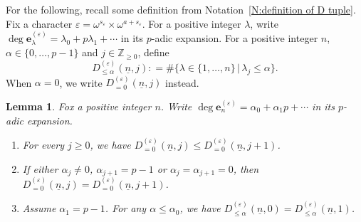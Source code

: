 \documentclass[12pt]{amsart}
\newcommand{\liang}[1]{{\color{blue} \sf $\clubsuit\clubsuit\clubsuit$ Liang: [#1]}}
\newtheorem{lemma}[subsection]{Lemma}
\theoremstyle{definition}
\numberwithin{equation}{subsection}
\def\ZZ{\mathbb{Z}}
\def\bfe{\mathbf{e}}
\begin{document}
For the following, recall some definition from Notation~\ref{N:definition of D tuple}. Fix a character $\varepsilon = \omega^{s_\varepsilon} \times \omega^{a+s_\varepsilon}$.
For a positive integer $\lambda$, write $\deg \bfe_\lambda^{(\varepsilon)} = \lambda_0+ p\lambda_1+\cdots$ in its $p$-adic expansion. For a positive integer $n$, $\alpha \in \{0, \dots, p-1\}$ and $j \in \ZZ_{\geq 0}$, define
$$
D_{\leq \alpha}^{(\varepsilon)}(\underline n, j): = \#\{ \lambda \in \{1, \dots, n\}\, |\, \lambda_j \leq \alpha\}.
$$
When $\alpha =0$, we write $D_{=0}^{(\varepsilon)}(\underline n,j)$ instead.
\begin{lemma}
\label{L:D independent of j}
Fox a positive integer $n$. Write $\deg \bfe_n^{(\varepsilon)}  = \alpha_0+ \alpha_1p+\cdots$ in its $p$-adic expansion.
\begin{enumerate}
\item 
For every $j \geq 0$, we have $D^{(\varepsilon)}_{=0}(\underline n,j) \leq D^{(\varepsilon)}_{=0}(\underline n,j+1)$.
\item  If either $\alpha_j\neq 0$, $\alpha_{j+1} = p-1$ or $\alpha_j= \alpha_{j+1}=0$, then $D^{(\varepsilon)}_{=0}(\underline n,j) = D^{(\varepsilon)}_{=0}(\underline n,j+1)$.
\item Assume $\alpha_1=p-1$. For any $\alpha\leq \alpha_0$, we have $D^{(\varepsilon)}_{\leq \alpha}(\underline n,0)=D^{(\varepsilon)}_{\leq \alpha}(\underline n, 1)$.
	\end{enumerate}
\end{lemma}
\end{document}
